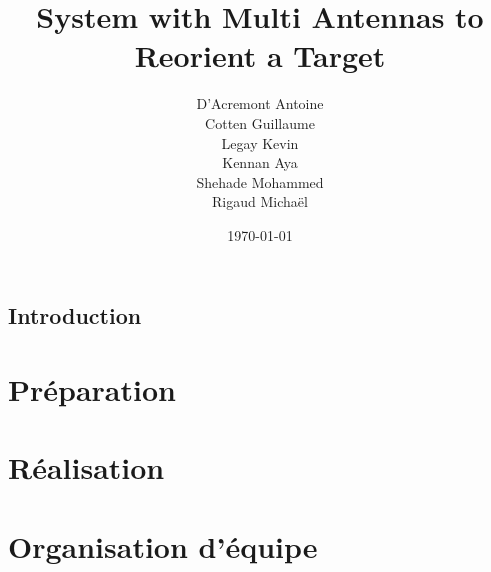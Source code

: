 \documentclass[a4paper, 11pt, oneside, oldfontcommands]{memoir}
\title{System with Multi Antennas to Reorient a Target}
\author{D'Acremont Antoine\\Cotten Guillaume\\Legay Kevin\\Kennan Aya\\Shehade Mohammed\\Rigaud Michaël}
\date{\today}
\newcounter{rem}[chapter]
\newcounter{th}[chapter]
\begin{document}
\maketitle
\thispagestyle{empty}
\newpage

\tableofcontents





\chapter*{Introduction}


\newpage	  


% 
% 
% 
% 
% 

%
%


\part{Préparation}





\part{Réalisation}






\part{Organisation d'équipe}
\end{document}
